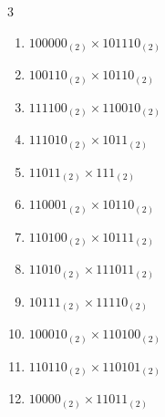 \begin{multicols}{3}
\begin{enumerate}
\columnbreak %

  \item $100000_{(2)} \times 101110_{(2)}$


  \item $100110_{(2)} \times 10110_{(2)}$


  \item $111100_{(2)} \times 110010_{(2)}$


  \item $111010_{(2)} \times 1011_{(2)}$


  \item $11011_{(2)} \times 111_{(2)}$


\columnbreak %

\resetques

  \item $110001_{(2)} \times 10110_{(2)}$


  \item $110100_{(2)} \times 10111_{(2)}$


  \item $11010_{(2)} \times 111011_{(2)}$


  \item $10111_{(2)} \times 11110_{(2)}$


  \item $100010_{(2)} \times 110100_{(2)}$


\columnbreak %

  \item $110110_{(2)} \times 110101_{(2)}$


  \item $10000_{(2)} \times 11011_{(2)}$



\end{enumerate}
\end{multicols}
